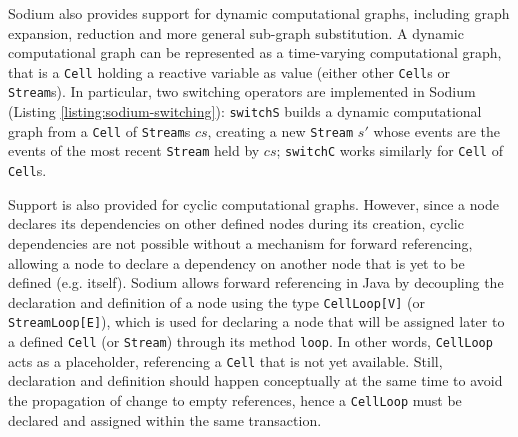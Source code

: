 

Sodium also provides support for dynamic computational graphs, including graph
expansion, reduction and more general sub-graph substitution. A dynamic
computational graph can be represented as a time-varying computational graph,
that is a \texttt{Cell} holding a reactive variable as value (either other
\texttt{Cell}s or \texttt{Stream}s). In particular, two switching operators are
implemented in Sodium (Listing \ref{listing:sodium-switching}):
\texttt{switchS} builds a dynamic computational graph from a \texttt{Cell} of
\texttt{Stream}s $cs$, creating a new \texttt{Stream} $s'$ whose events are the
events of the most recent \texttt{Stream} held by $cs$; \texttt{switchC} works
similarly for \texttt{Cell} of \texttt{Cell}s.



Support is also provided for cyclic computational graphs. However, since a node
declares its dependencies on other defined nodes during its creation, cyclic
dependencies are not possible without a mechanism for forward referencing,
allowing a node to declare a dependency on another node that is yet to be
defined (e.g. itself). Sodium allows forward referencing in Java by decoupling
the declaration and definition of a node using the type \texttt{CellLoop[V]}
(or \texttt{StreamLoop[E]}), which is used for declaring a node that will be
assigned later to a defined \texttt{Cell} (or \texttt{Stream}) through its
method \texttt{loop}. In other words, \texttt{CellLoop} acts as a placeholder,
referencing a \texttt{Cell} that is not yet available. Still, declaration and
definition should happen conceptually at the same time to avoid the propagation
of change to empty references, hence a \texttt{CellLoop} must be declared and
assigned within the same transaction.



